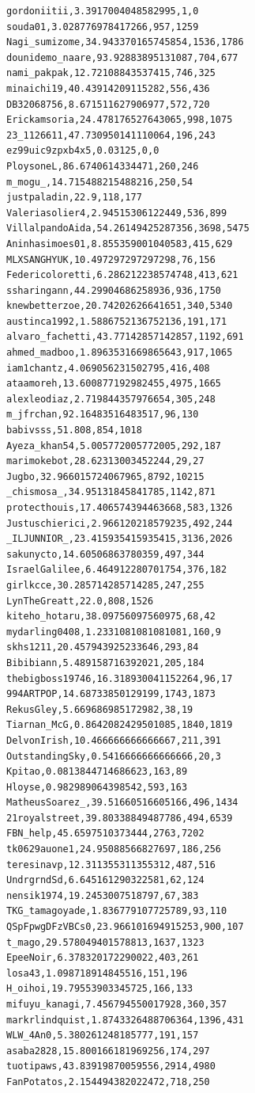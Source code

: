 \begin{verbatim}
gordoniitii,3.3917004048582995,1,0
souda01,3.028776978417266,957,1259
Nagi_sumizome,34.943370165745854,1536,1786
dounidemo_naare,93.92883895131087,704,677
nami_pakpak,12.72108843537415,746,325
minaichi19,40.43914209115282,556,436
DB32068756,8.671511627906977,572,720
Erickamsoria,24.478176527643065,998,1075
23_1126611,47.730950141110064,196,243
ez99uic9zpxb4x5,0.03125,0,0
PloysoneL,86.6740614334471,260,246
m_mogu_,14.715488215488216,250,54
justpaladin,22.9,118,177
Valeriasolier4,2.94515306122449,536,899
VillalpandoAida,54.26149425287356,3698,5475
Aninhasimoes01,8.855359001040583,415,629
MLXSANGHYUK,10.497297297297298,76,156
Federicoloretti,6.286212238574748,413,621
ssharingann,44.29904686258936,936,1750
knewbetterzoe,20.74202626641651,340,5340
austinca1992,1.5886752136752136,191,171
alvaro_fachetti,43.77142857142857,1192,691
ahmed_madboo,1.8963531669865643,917,1065
iam1chantz,4.069056231502795,416,408
ataamoreh,13.600877192982455,4975,1665
alexleodiaz,2.719844357976654,305,248
m_jfrchan,92.16483516483517,96,130
babivsss,51.808,854,1018
Ayeza_khan54,5.005772005772005,292,187
marimokebot,28.62313003452244,29,27
Jugbo,32.966015724067965,8792,10215
_chismosa_,34.95131845841785,1142,871
protecthouis,17.406574394463668,583,1326
Justuschierici,2.966120218579235,492,244
_ILJUNNIOR_,23.415935415935415,3136,2026
sakunycto,14.60506863780359,497,344
IsraelGalilee,6.464912280701754,376,182
girlkcce,30.285714285714285,247,255
LynTheGreatt,22.0,808,1526
kiteho_hotaru,38.09756097560975,68,42
mydarling0408,1.2331081081081081,160,9
skhs1211,20.457943925233646,293,84
Bibibiann,5.489158716392021,205,184
thebigboss19746,16.318930041152264,96,17
994ARTPOP,14.68733850129199,1743,1873
RekusGley,5.669686985172982,38,19
Tiarnan_McG,0.8642082429501085,1840,1819
DelvonIrish,10.466666666666667,211,391
OutstandingSky,0.5416666666666666,20,3
Kpitao,0.0813844714686623,163,89
Hloyse,0.982989064398542,593,163
MatheusSoarez_,39.51660516605166,496,1434
21royalstreet,39.80338849487786,494,6539
FBN_help,45.6597510373444,2763,7202
tk0629auone1,24.95088566827697,186,256
teresinavp,12.311355311355312,487,516
UndrgrndSd,6.645161290322581,62,124
nensik1974,19.2453007518797,67,383
TKG_tamagoyade,1.836779107725789,93,110
QSpFpwgDFzVBCs0,23.966101694915253,900,107
t_mago,29.578049401578813,1637,1323
EpeeNoir,6.378320172290022,403,261
losa43,1.098718914845516,151,196
H_oihoi,19.79553903345725,166,133
mifuyu_kanagi,7.456794550017928,360,357
markrlindquist,1.8743326488706364,1396,431
WLW_4An0,5.380261248185777,191,157
asaba2828,15.800166181969256,174,297
tuotipaws,43.83919870059556,2914,4980
FanPotatos,2.154494382022472,718,250

\end{verbatim}
